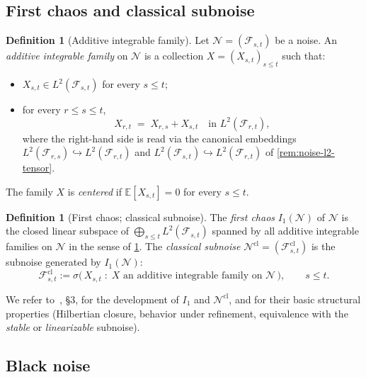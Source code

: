 \documentclass[11pt,reqno]{amsart}
\theoremstyle{plain}
\theoremstyle{definition}
\newtheorem{definition}[theorem]{Definition}
\theoremstyle{remark}
\newcommand{\E}{\mathbb{E}}
\begin{document}
\subsection{First chaos and classical subnoise}\label{sec:def-classical}

\begin{definition}[Additive integrable family]\label{def:additive-family}
Let $\mathcal N=(\mathcal F_{s,t})$ be a noise. An \emph{additive
integrable family} on $\mathcal N$ is a collection
$X=(X_{s,t})_{s\le t}$ such that:
\begin{itemize}
\item[$(\mathrm i)$] $X_{s,t}\in L^2(\mathcal F_{s,t})$ for every $s\le t$;
\item[$(\mathrm{ii})$] for every $r\le s\le t$,
\begin{equation}\label{eq:additivity}
  X_{r,t}\;=\;X_{r,s}+X_{s,t}\quad\text{in }L^2(\mathcal F_{r,t}),
\end{equation}
where the right-hand side is read via the canonical embeddings
$L^2(\mathcal F_{r,s})\hookrightarrow L^2(\mathcal F_{r,t})$ and
$L^2(\mathcal F_{s,t})\hookrightarrow L^2(\mathcal F_{r,t})$ of
\cref{rem:noise-l2-tensor}.
\end{itemize}
The family $X$ is \emph{centered} if $\E[X_{s,t}]=0$ for every $s\le t$.
\end{definition}

\begin{definition}[First chaos; classical subnoise]\label{def:classical-subnoise}
The \emph{first chaos} $I_1(\mathcal N)$ of $\mathcal N$ is the
closed linear subspace of $\bigoplus_{s\le t}L^2(\mathcal F_{s,t})$
spanned by all additive integrable families on $\mathcal N$ in the
sense of \cref{def:additive-family}. The \emph{classical subnoise}
$\mathcal N^{\mathrm{cl}}=(\mathcal F^{\mathrm{cl}}_{s,t})$ is the
subnoise generated by $I_1(\mathcal N)$:
\[
  \mathcal F^{\mathrm{cl}}_{s,t}
  :=\sigma\bigl(\,X_{s,t}\;:\;X\text{ an additive integrable family on }\mathcal N\,\bigr),
  \qquad s\le t.
\]
\end{definition}

We refer to~\cite{Tsirelson2004}, \S 3, for the development of $I_1$
and $\mathcal N^{\mathrm{cl}}$, and for their basic structural
properties (Hilbertian closure, behavior under refinement,
equivalence with the \emph{stable} or \emph{linearizable} subnoise).

\subsection{Black noise}\label{sec:def-black}
\end{document}
